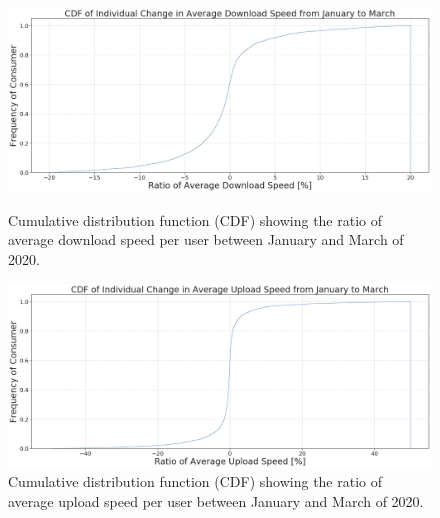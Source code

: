 \documentclass[conference,10pt]{IEEEtran}
\begin{document}

\begin{figure}[t]
  \begin{minipage}[t]{0.490\linewidth}
    \centering
    \includegraphics[width=0.98\linewidth]{figs/downspeed.PNG}
    \caption{Cumulative distribution function (CDF) showing the ratio of average download speed per user between January and March of 2020.}
    \label{fig:downloadspeed2020}
  \end{minipage}
  \hspace*{\fill}
  \begin{minipage}[t]{0.490\linewidth}
    \centering
    \includegraphics[width=0.98\linewidth]{figs/uploadspeed.PNG}
    \caption{Cumulative distribution function (CDF) showing the ratio of average upload speed per user between January and March of 2020.}
    \label{fig:uploadspeed2020}
  \end{minipage}
\end{figure}
\end{document}
